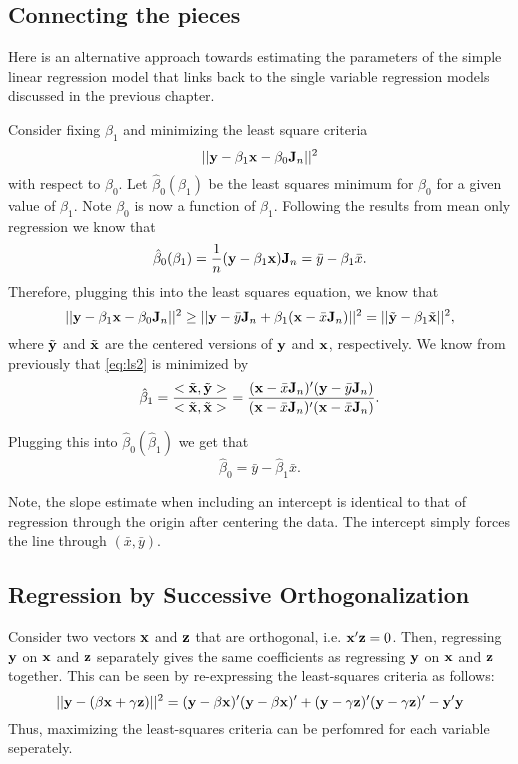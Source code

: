 \subsection{Connecting the pieces}

Here is an alternative approach towards estimating the parameters of the simple linear regression model that links back to the single variable regression models discussed in the previous chapter. 

Consider fixing $\beta_1$ and minimizing the least square criteria 
$$
|| \mathbf{y} - \beta_1 \mathbf{x}  - \beta_0 \mathbf{J}_n ||^2
$$
with respect to $\beta_0$.
Let $\hat \beta_0 (\beta_1)$ be the least squares minimum for $\beta_0$ for a given value of $\beta_1$.  Note $\beta_0$ is now a function of $\beta_1$.
Following the results from mean only regression we know that
\begin{equation*}
\label{eq:intercept}
\hat \beta_0 (\beta_1) = \frac{1}{n}(\mathbf{y} - \beta_1 \mathbf{x}) \mathbf{J}_n = \bar y - \beta_1 \bar x.
\end{equation*}
Therefore, plugging this into the least squares equation, we know that
\begin{equation}
\label{eq:ls2}
|| \mathbf{y} - \beta_1 \mathbf{x}  - \beta_0 \mathbf{J}_n ||^2 \geq 
|| \mathbf{y} -  \bar y \mathbf{J}_n + \beta_1 (\mathbf{x}  - \bar x \mathbf{J}_n) ||^2= || \tilde {\mathbf{y}} - \beta_1 \tilde {\mathbf{x}}||^2,
\end{equation}
where $\tilde {\mathbf{y}}$ and $\tilde {\mathbf{x}}$ are the centered versions of $\mathbf{y}$ and
$\mathbf{x}$, respectively. We know from previously that \eqref{eq:ls2} is minimized by 
$$
{\hat \beta_1} = \frac{<\tilde {\mathbf{x}}, \tilde {\mathbf{y}}>}{<\tilde {\mathbf{x}}, \tilde {\mathbf{x}}>} = \frac{(\mathbf{x}- \bar x \mathbf{J}_n)' (\mathbf{y} - \bar y \mathbf{J}_n)}{(\mathbf{x}- \bar x \mathbf{J}_n)'(\mathbf{x}- \bar x \mathbf{J}_n)}.
$$


Plugging this into $\hat \beta_0(\hat \beta_1)$ we get that
$$
\hat \beta_0 = \bar y - \hat \beta_1 \bar x.
$$

Note, the slope estimate when including an intercept is identical to that of
regression through the origin after centering the data. The intercept simply
forces the line through $(\bar x, \bar y)$.


\subsection{Regression by Successive Orthogonalization}
Consider two vectors $\mathbf{x}$ and $\mathbf{z}$ that are orthogonal, i.e. $\mathbf{x}' \mathbf{z} = 0$. Then, regressing $\mathbf{y}$ on $\mathbf{x}$ and $\mathbf{z}$ separately gives the same
coefficients as regressing $\mathbf{y}$ on $\mathbf{x}$ and $\mathbf{z}$ together. This can be seen by re-expressing the least-squares criteria as follows:
$$
|| \mathbf{y} - (\beta \mathbf{x} + \gamma \mathbf{z}) ||^2 = 
(\mathbf{y} - \beta \mathbf{x})' (\mathbf{y} - \beta \mathbf{x})' + (\mathbf{y} - \gamma \mathbf{z})' (\mathbf{y} - \gamma \mathbf{z})'  -  \mathbf{y}'\mathbf{y}
$$
Thus, maximizing the least-squares criteria can be perfomred for each variable seperately.

